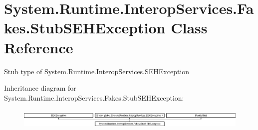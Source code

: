 \hypertarget{class_system_1_1_runtime_1_1_interop_services_1_1_fakes_1_1_stub_s_e_h_exception}{\section{System.\-Runtime.\-Interop\-Services.\-Fakes.\-Stub\-S\-E\-H\-Exception Class Reference}
\label{class_system_1_1_runtime_1_1_interop_services_1_1_fakes_1_1_stub_s_e_h_exception}
}


Stub type of System.\-Runtime.\-Interop\-Services.\-S\-E\-H\-Exception 


Inheritance diagram for System.\-Runtime.\-Interop\-Services.\-Fakes.\-Stub\-S\-E\-H\-Exception\-:\begin{figure}[H]
\begin{center}
\leavevmode
\includegraphics[height=0.995556cm]{class_system_1_1_runtime_1_1_interop_services_1_1_fakes_1_1_stub_s_e_h_exception}
\end{center}
\end{figure}
